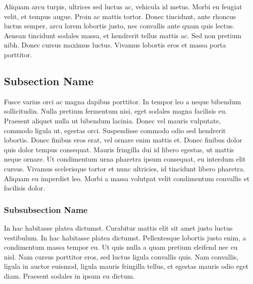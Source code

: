 \documentclass{faims3_report}
\begin{document}
Aliquam arcu turpis, ultrices sed luctus ac, vehicula id metus. Morbi eu feugiat velit, et tempus augue. Proin ac mattis tortor. Donec tincidunt, ante rhoncus luctus semper, arcu lorem lobortis justo, nec convallis ante quam quis lectus. Aenean tincidunt sodales massa, et hendrerit tellus mattis ac. Sed non pretium nibh. Donec cursus maximus luctus. Vivamus lobortis eros et massa porta porttitor.

\subsection{Subsection Name}

Fusce varius orci ac magna dapibus porttitor. In tempor leo a neque bibendum sollicitudin. Nulla pretium fermentum nisi, eget sodales magna facilisis eu. Praesent aliquet nulla ut bibendum lacinia. Donec vel mauris vulputate, commodo ligula ut, egestas orci. Suspendisse commodo odio sed hendrerit lobortis. Donec finibus eros erat, vel ornare enim mattis et. Donec finibus dolor quis dolor tempus consequat. Mauris fringilla dui id libero egestas, ut mattis neque ornare. Ut condimentum urna pharetra ipsum consequat, eu interdum elit cursus. Vivamus scelerisque tortor et nunc ultricies, id tincidunt libero pharetra. Aliquam eu imperdiet leo. Morbi a massa volutpat velit condimentum convallis et facilisis dolor.

\subsubsection{Subsubsection Name}

In hac habitasse platea dictumst. Curabitur mattis elit sit amet justo luctus vestibulum. In hac habitasse platea dictumst. Pellentesque lobortis justo enim, a condimentum massa tempor eu. Ut quis nulla a quam pretium eleifend nec eu nisl. Nam cursus porttitor eros, sed luctus ligula convallis quis. Nam convallis, ligula in auctor euismod, ligula mauris fringilla tellus, et egestas mauris odio eget diam. Praesent sodales in ipsum eu dictum.

\end{document}
